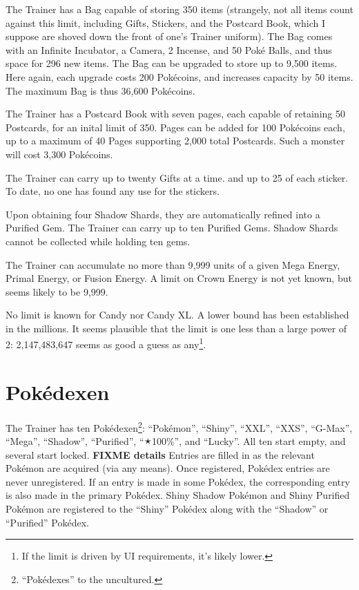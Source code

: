 The Trainer has a Bag capable of storing 350 items (strangely, not all items
  count against this limit, including Gifts, Stickers, and the Postcard Book,
  which I suppose are shoved down the front of one's Trainer uniform).
The Bag comes with an Infinite Incubator, a Camera, 2 Incense, and 50 Poké Balls,
  and thus space for 296 new items.
The Bag can be upgraded to store up to 9,500 items.
Here again, each upgrade costs 200 Pokécoins, and increases capacity by 50 items.
The maximum Bag is thus 36,600 Pokécoins.

The Trainer has a Postcard Book with seven pages, each capable of retaining
 50 Postcards, for an inital limit of 350.
Pages can be added for 100 Pokécoins each, up to a maximum of 40 Pages
 supporting 2,000 total Postcards.
Such a monster will cost 3,300 Pokécoins.

The Trainer can carry up to twenty Gifts at a time. and up to 25 of each sticker.
To date, no one has found any use for the stickers.

Upon obtaining four Shadow Shards, they are automatically refined into a Purified Gem.
The Trainer can carry up to ten Purified Gems.
Shadow Shards cannot be collected while holding ten gems.

The Trainer can accumulate no more than 9,999 units of a given Mega Energy,
 Primal Energy, or Fusion Energy.
A limit on Crown Energy is not yet known, but seems likely to be 9,999.

No limit is known for Candy nor Candy XL.
A lower bound has been established in the millions.
It seems plausible that the limit is one less than a large power of 2:
  2,147,483,647 seems as good a guess as any\footnote{If the limit is driven by UI requirements, it's likely lower.}.

\section{Pokédexen}
\label{sec:dexen}
The Trainer has ten Pokédexen\footnote{``Pokédexes'' to the uncultured.}:
  ``Pokémon'', ``Shiny'', ``XXL'', ``XXS'', ``G-Max'', ``Mega'', ``Shadow'',
  ``Purified'', ``🟉100\%'', and ``Lucky''.
All ten start empty, and several start locked.
\textbf{FIXME details}
Entries are filled in as the relevant Pokémon are acquired (via any means).
Once registered, Pokédex entries are never unregistered.
If an entry is made in some Pokédex, the corresponding entry is also made
  in the primary Pokédex.
Shiny Shadow Pokémon and Shiny Purified Pokémon are registered to the
  ``Shiny'' Pokédex along with the ``Shadow'' or ``Purified'' Pokédex.

